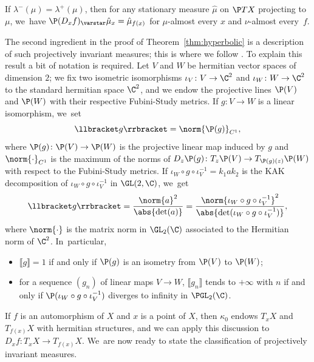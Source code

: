 \begin{thm}\label{thm:ledrappier_invariance_principle}
If $\lambda^{-}(\mu) = \lambda^{+}(\mu)$, then for any stationary measure $\hat \mu$ on $\P TX$ projecting to $\mu$, we~have $\P(D_xf)_\varstar \hat\mu_x = \hat\mu_{f(x)}$
for $\mu$-almost every $x$ and $\nu$-almost every~$f$.
\end{thm}

The second ingredient in the proof of Theorem~\ref{thm:hyperbolic} is
a description of such projectively invariant measures; this is where we follow \cite{barrientos-malicet}.
To explain this result a bit of notation is required. Let $V$ and $W$ be hermitian vector spaces of dimension $2$;
we fix two isometric isomorphisms $\iota_V\colon V\to \C^2$ and $\iota_W\colon W\to \C^2$ to the standard
hermitian space $\C^2$, and we endow the projective lines $\P(V)$ and $\P(W)$ with their respective Fubini-Study metrics. If $g\colon V\to W$
is a linear isomorphism, we~set
\begin{equation*}
\llbracket g \rrbracket= \norm{ \P (g) }_{C^1},
\end{equation*}
where $\P(g) \colon \P(V)\to \P(W)$
is the projective linear map induced by $g$ and $\norm{\cdot}_{C^1}$
is the maximum of the norms of $D_z\P(g) \colon T_z\P(V)\to T_{\P (g)(z)}\P(W)$ with respect to the Fubini-Study metrics.
If $\iota_W\circ g\circ \iota_V^{-1} = k_1ak_2$ is the KAK decomposition of
$\iota_W\circ g\circ \iota_V^{-1}$ in $\GL(2, \C)$, we~get
\begin{equation*}
\llbracket g \rrbracket = \frac{\norm{a}^2}{\abs{\det(a)}} = \frac{\norm{\iota_W\circ g\circ \iota_V^{-1}}^2}{\abs{\det(\iota_W\circ g\circ \iota_V^{-1})}},
\end{equation*}
where
$\norm{\cdot}$ is the matrix norm in $\GL_2(\C)$ associated to the Hermitian norm of $\C^2$. In~particular,
\begin{itemize}
\item[(a)] $\llbracket g \rrbracket=1$ if and only if $\P (g)$ is an isometry from $\P(V)$ to $\P(W)$;
\item[(b)] for a sequence $(g_n)$ of linear maps $V\to W$,
$\llbracket g_n\rrbracket$ tends to $+\infty$ with $n$ if and only if $\P(\iota_W\circ g\circ \iota_V^{-1})$
diverges to infinity in $\PGL_2(\C)$.
\end{itemize}
If $f$ is an automorphism of $X$ and $x$ is a point of $X$, then $\kappa_0$ endows $T_xX$ and $T_{f(x)}X$ with
hermitian structures, and we can apply this discussion to $D_xf\colon T_xX\to T_{f(x)}X$. We~are now ready to state the classification of projectively invariant measures.

